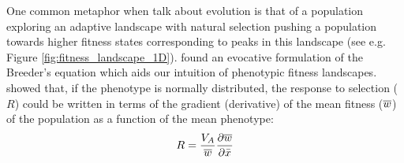 One common metaphor when talk about evolution is that of a population exploring an adaptive landscape with natural selection pushing a population
towards higher fitness states corresponding to peaks in this landscape
(see e.g. Figure \ref{fig:fitness_landscape_1D}).  
\citet{lande1976natural} found an evocative formulation of the
Breeder's equation which aids our intuition of phenotypic fitness
landscapes.
 
\citeauthor{lande1976natural} showed that, if the phenotype is
normally distributed, the response to
selection ($R$) could be written in terms of the gradient (derivative) of the
mean fitness ($\overline{w}$) of the population as a function of the mean phenotype:  
\begin{equation}
  R = \frac{V_A}{\wbar} \frac{\partial \wbar}{\partial \bar{x}}  %
\end{equation}

